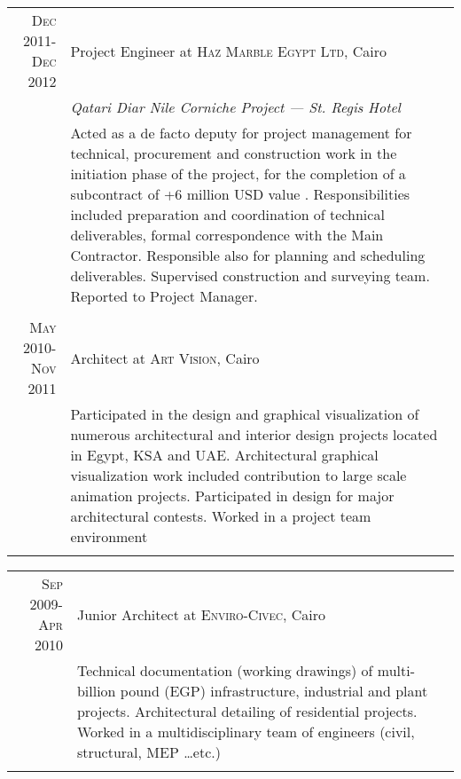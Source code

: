 \documentclass[a4paper,11pt]{article} %
\begin{document}
\begin{tabular}{r|p{11cm}}

\textsc{Dec 2011-Dec 2012} & Project Engineer at \textsc{Haz Marble Egypt Ltd}, Cairo \\
& \emph{Qatari Diar Nile Corniche Project --- St. Regis Hotel} \\
& \footnotesize{Acted as a de facto deputy for project management for technical, procurement and construction work in the initiation phase of the project, for the completion of a subcontract of +6 million USD value . Responsibilities included preparation and coordination of technical deliverables, formal correspondence with the Main Contractor. Responsible also for planning and scheduling deliverables. Supervised construction and surveying team. Reported to Project Manager.}\\
\multicolumn{2}{c}{} \\



\textsc{May 2010-Nov 2011} & Architect at \textsc{Art Vision}, Cairo \emph{}\\
& \footnotesize{Participated in the design and graphical visualization of numerous architectural and interior design projects located in Egypt, KSA and UAE. Architectural graphical visualization work included contribution to large scale animation projects. Participated in design for major architectural contests. Worked in a project team environment}\\
\multicolumn{2}{c}{} \\



\end{tabular}

\begin{tabular}{r|p{11cm}}
	
\textsc{Sep 2009-Apr 2010} & Junior Architect at \textsc{Enviro-Civec}, Cairo \emph{}\\
& \footnotesize{Technical documentation (working drawings) of multi-billion pound (EGP) infrastructure, industrial and plant projects. Architectural detailing of residential projects. Worked in a multidisciplinary team of engineers (civil, structural, MEP \ldots{}etc.)}\\
\multicolumn{2}{c}{} \\

\end{tabular}
\end{document}
